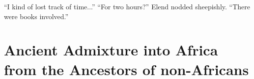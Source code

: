 \begin{savequote}[10cm]

  ``I kind of lost track of time...''\newline
  ``For two hours?''\newline
  Elend nodded sheepishly. ``There were books involved.''
  
\end{savequote}

\chapter{Ancient Admixture into Africa from the Ancestors of non-Africans} \label{ch:aaa}









